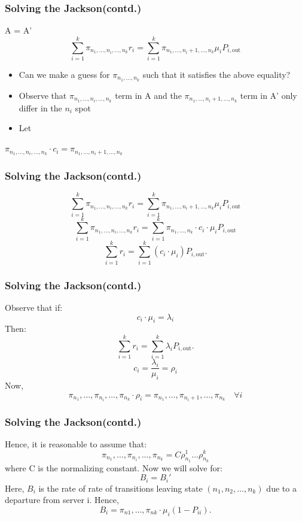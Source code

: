 \documentclass[10pt,notes]{beamer}
\begin{document}
\begin{frame}
    \frametitle{Solving the Jackson(contd.)}
    \begin{center} 
        A = A'
        \[\sum_{i=1}^{k} \pi_{n_1,\ldots,n_i,\ldots,n_k} r_i = \sum_{i=1}^{k} \pi_{n_1,\ldots,n_i+1,\ldots,n_k} \mu_i P_{i,\text{out}}\]
    \end{center}
        \begin{itemize}
        \item Can we make a guess for \(\pi_{n_1,\ldots,n_k}\) such that it satisfies the above equality?
        \item Observe that \(\pi_{n_1,\ldots,n_i,\ldots,n_k}\) term in A and the \(\pi_{n_1,\ldots,n_i+1,\ldots,n_k}\) term in A' only differ in the \(n_i\) spot
        \item Let 
    \end{itemize}
    
    \begin{center} 
        \(\pi_{n_1,\ldots,n_i,\ldots,n_k} \cdot c_i = \pi_{n_1,\ldots,n_i+1,\ldots,n_k}\)
    \end{center}
\end{frame}

\begin{frame}
    \frametitle{Solving the Jackson(contd.)}
        \[
        \sum_{i=1}^{k} \pi_{n_1,\ldots,n_i,\ldots,n_k} r_i = \sum_{i=1}^{k} \pi_{n_1,\ldots,n_i+1,\ldots,n_k} \mu_i P_{i,\text{out}}
        \]
        \[
        \sum_{i=1}^{k} \pi_{n_1,\ldots,n_i,\ldots,n_k} r_i = \sum_{i=1}^{k} \pi_{n_1,\ldots,n_k} \cdot c_i \cdot \mu_i P_{i,\text{out}}
        \]
        \[
        \sum_{i=1}^{k} r_i = \sum_{i=1}^{k} (c_i \cdot \mu_i) P_{i,\text{out}}.
        \]

    
\end{frame}
\begin{frame}
    \frametitle{Solving the Jackson(contd.)}
    Observe that if:
    \[c_i \cdot \mu_i = \lambda_i\]
    Then:
    \[\sum_{i=1}^{k} r_i = \sum_{i=1}^{k} \lambda_i P_{i,\text{out}}.\] \[c_i = \frac{\lambda_i}{\mu_i} = \rho_i\]
    Now,
    \[\pi_{n_1}, \ldots, \pi_{n_i}, \ldots, \pi_{n_k} \cdot \rho_i = \pi_{n_1}, \ldots, \pi_{n_i+1}, \ldots, \pi_{n_k} \quad \forall i\]
    
\end{frame}

\begin{frame}
    \frametitle{Solving the Jackson(contd.)}
    Hence, it is reasonable to assume that:
    \[\pi_{n_1}, \ldots, \pi_{n_i}, \ldots, \pi_{n_k} = C \rho_{n_1}^{1} \ldots \rho_{n_k}^{k}\]
    where C is the normalizing constant. Now we will solve for:
    \[B_i = B_i'\]
    Here, \(B_i\) is the rate of rate of transitions leaving state \((n_1, n_2, \ldots, n_k)\) due to a departure from server i. Hence,
    \[B_i = \pi_{n1}, \ldots, \pi_{nk} \cdot \mu_i(1 - P_{ii}).\]
\end{frame}
\end{document}
